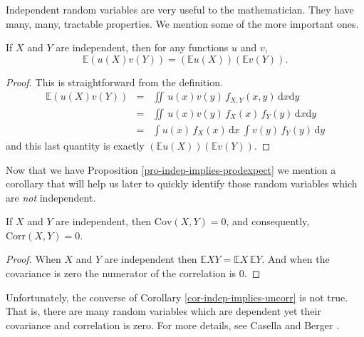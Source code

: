 Independent random variables are very useful to the
mathematician. They have many, many, tractable properties. We mention
some of the more important ones.

\begin{prop}
\label{pro-indep-implies-prodexpect} If \(X\) and \(Y\) are independent,
then for any functions \(u\) and \(v\),
\begin{equation}
\mathbb{E}\left(u(X)v(Y)\right)=\left(\mathbb{E} u(X)\right)\left(\mathbb{E} v(Y)\right).
\end{equation}
\end{prop}

\begin{proof}
This is straightforward from the definition.
\begin{eqnarray*}
\mathbb{E}\left(u(X)v(Y)\right) & = & \iint\, u(x)v(y)\, f_{X,Y}(x,y)\,\mathrm{d} x\mathrm{d} y\\
 & = & \iint\, u(x)v(y)\, f_{X}(x)\, f_{Y}(y)\,\mathrm{d} x\mathrm{d} y\\
 & = & \int u(x)\, f_{X}(x)\,\mathrm{d} x\ \int v(y)\, f_{Y}(y)\,\mathrm{d} y
\end{eqnarray*}
and this last quantity is exactly \(\left(\mathbb{E} u(X)\right)\left(\mathbb{E} v(Y)\right)\). 
\end{proof}

Now that we have Proposition \ref{pro-indep-implies-prodexpect} we mention a
corollary that will help us later to quickly identify those random
variables which are \emph{not} independent.

\begin{cor}
\label{cor-indep-implies-uncorr} If \(X\) and \(Y\) are independent, then
\(\mbox{Cov}(X,Y)=0\), and consequently, \(\mbox{Corr}(X,Y)=0\).
\end{cor}

\begin{proof}
When \(X\) and \(Y\) are independent then \(\mathbb{E} XY=\mathbb{E}
X\,\mathbb{E} Y\). And when the covariance is zero the numerator of
the correlation is 0.
\end{proof}

\begin{rem}
\label{rem-cov0-not-imply-indep} Unfortunately, the converse of Corollary
\ref{cor-indep-implies-uncorr} is not true. That is, there are many random
variables which are dependent yet their covariance and correlation is
zero. For more details, see Casella and Berger \cite{Casella2002}.
\end{rem}

